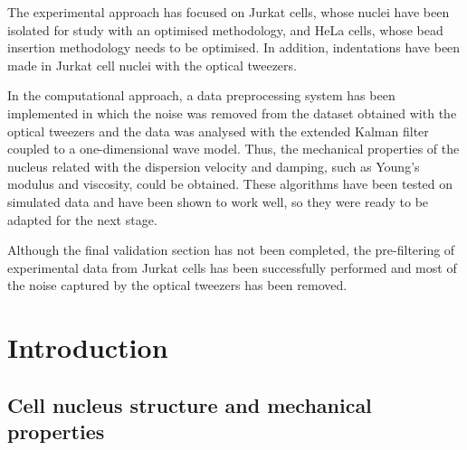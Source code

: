 \documentclass[12pt, a4paper]{article} %
\begin{document}
The experimental approach has focused on Jurkat cells, whose nuclei have been isolated for study with an optimised methodology, and HeLa cells, whose bead insertion methodology needs to be optimised. In addition, indentations have been made in Jurkat cell nuclei with the optical tweezers.

In the computational approach, a data preprocessing system has been implemented in which the noise was removed from the dataset obtained with the optical tweezers and the data was analysed with the extended Kalman filter coupled to a one-dimensional wave model. Thus, the mechanical properties of the nucleus related with the dispersion velocity and damping, such as Young's modulus and viscosity, could be obtained. These algorithms have been tested on simulated data and have been shown to work well, so they were ready to be adapted for the next stage.

Although the final validation section has not been completed, the pre-filtering of experimental data from Jurkat cells has been successfully performed and most of the noise captured by the optical tweezers has been removed.

\vspace{1cm}

\newpage


\tableofcontents
\setcounter{tocdepth}{2}
\newpage

\setcounter{page}{1}
\pagestyle{fancy}
\lhead{ }
\renewcommand{\headrulewidth}{0.005pt}

\setlength{\parskip}{0mm}

\section{Introduction}

\subsection{Cell nucleus structure and mechanical properties}
\end{document}
